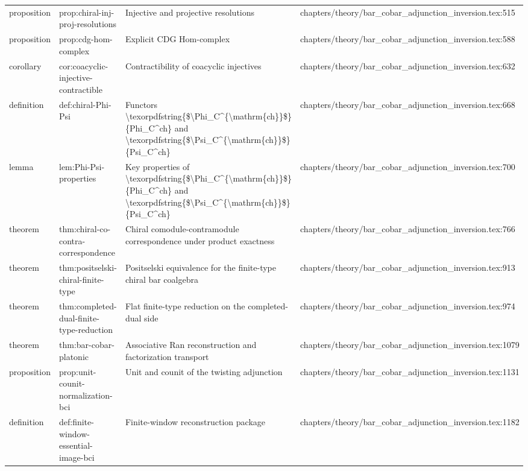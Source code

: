 \documentclass[11pt]{article}
\begin{document}
\begin{longtable}{L{0.10\textwidth}L{0.26\textwidth}L{0.42\textwidth}L{0.22\textwidth}}
proposition & prop:chiral-inj-proj-resolutions & Injective and projective resolutions & chapters/theory/bar\_cobar\_adjunction\_inversion.tex:515\\
proposition & prop:cdg-hom-complex & Explicit CDG Hom-complex & chapters/theory/bar\_cobar\_adjunction\_inversion.tex:588\\
corollary & cor:coacyclic-injective-contractible & Contractibility of coacyclic injectives & chapters/theory/bar\_cobar\_adjunction\_inversion.tex:632\\
definition & def:chiral-Phi-Psi & Functors \textbackslash{}texorpdfstring\{\$\textbackslash{}Phi\_C\textasciicircum{}\{\textbackslash{}mathrm\{ch\}\}\$\}\{Phi\_C\textasciicircum{}ch\} and \textbackslash{}texorpdfstring\{\$\textbackslash{}Psi\_C\textasciicircum{}\{\textbackslash{}mathrm\{ch\}\}\$\}\{Psi\_C\textasciicircum{}ch\} & chapters/theory/bar\_cobar\_adjunction\_inversion.tex:668\\
lemma & lem:Phi-Psi-properties & Key properties of \textbackslash{}texorpdfstring\{\$\textbackslash{}Phi\_C\textasciicircum{}\{\textbackslash{}mathrm\{ch\}\}\$\}\{Phi\_C\textasciicircum{}ch\} and \textbackslash{}texorpdfstring\{\$\textbackslash{}Psi\_C\textasciicircum{}\{\textbackslash{}mathrm\{ch\}\}\$\}\{Psi\_C\textasciicircum{}ch\} & chapters/theory/bar\_cobar\_adjunction\_inversion.tex:700\\
theorem & thm:chiral-co-contra-correspondence & Chiral comodule-contramodule correspondence under product exactness & chapters/theory/bar\_cobar\_adjunction\_inversion.tex:766\\
theorem & thm:positselski-chiral-finite-type & Positselski equivalence for the finite-type chiral bar coalgebra & chapters/theory/bar\_cobar\_adjunction\_inversion.tex:913\\
theorem & thm:completed-dual-finite-type-reduction & Flat finite-type reduction on the completed-dual side & chapters/theory/bar\_cobar\_adjunction\_inversion.tex:974\\
theorem & thm:bar-cobar-platonic & Associative Ran reconstruction and factorization transport & chapters/theory/bar\_cobar\_adjunction\_inversion.tex:1079\\
proposition & prop:unit-counit-normalization-bci & Unit and counit of the twisting adjunction & chapters/theory/bar\_cobar\_adjunction\_inversion.tex:1131\\
definition & def:finite-window-essential-image-bci & Finite-window reconstruction package & chapters/theory/bar\_cobar\_adjunction\_inversion.tex:1182\\

\end{longtable}
\end{document}
